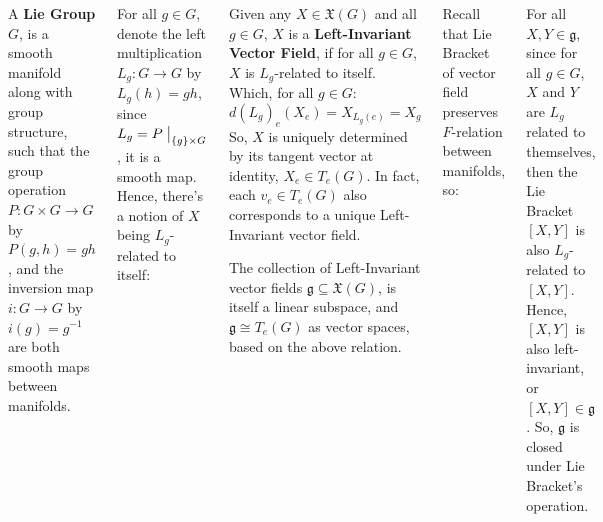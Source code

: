 \documentclass[20pt,margin=0.9in,innermargin=-4.5in,blockverticalspace=-0.25in]{tikzposter}
\begin{document}
\begin{columns}
{        \begin{definitionBox}
            A \textbf{Lie Group} $G$, is a smooth manifold along with group structure, such that the group operation $P:G\times G\rightarrow G$ by $P(g,h) = gh$, and the inversion map $i:G\rightarrow G$ by $i(g)=g^{-1}$ are both smooth maps between manifolds.
        \end{definitionBox}

        For all $g\in G$, denote the left multiplication $L_g:G\rightarrow G$ by $L_g(h)=gh$,
        since $L_g = P\bigm|_{\{g\}\times G}$, it is a smooth map. Hence, there's a notion of $X$ being $L_g$-related to itself:

        \begin{definitionBox}
            Given any $X\in\mathfrak{X}(G)$ and all $g\in G$, $X$ is a \textbf{Left-Invariant Vector Field}, if for all $g\in G$, $X$ is $L_g$-related to itself. Which, for all $g\in G$: 
            $$d(L_g)_e(X_e) = X_{L_g(e)} = X_g$$ 
            So, $X$ is uniquely determined by its tangent vector at identity, $X_e\in T_e(G)$. In fact, each $v_e\in T_e(G)$ also corresponds to a unique Left-Invariant vector field.

            The collection of Left-Invariant vector fields $\mathfrak{g}\subseteq \mathfrak{X}(G)$, is itself a linear subspace, and $\mathfrak{g}\cong T_e(G)$ as vector spaces, based on the above relation.
            
        \end{definitionBox}

        Recall that Lie Bracket of vector field preserves $F$-relation between manifolds, so:
        \begin{theoremBox}
            For all $X,Y\in\mathfrak{g}$, since for all $g\in G$, $X$ and $Y$ are $L_g$ related to themselves, then the Lie Bracket $[X,Y]$ is also $L_g$-related to $[X,Y]$. Hence, $[X,Y]$ is also left-invariant, or $[X,Y]\in \mathfrak{g}$. So, $\mathfrak{g}$ is closed under Lie Bracket's operation.
        \end{theoremBox}
    }


\end{columns}
\end{document}
